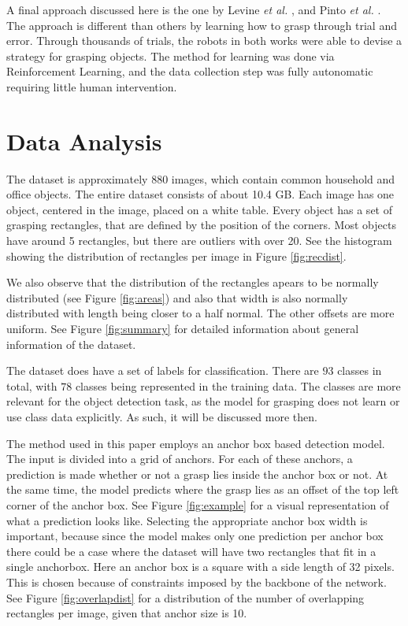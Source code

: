 \documentclass{article}
\begin{document}
A final approach discussed here is the one by Levine \textit{et al.} \cite{levine2018},
and Pinto \textit{et al.} \cite{pinto2016}. The approach is different than others by
learning how to grasp through trial and error. Through thousands of trials, the
robots in both works were able to devise a strategy for grasping objects. The method
for learning was done via Reinforcement Learning, and the data collection step was
fully autonomatic requiring little human intervention.

\newpage
\section{Data Analysis}
The dataset is approximately 880 images, which contain common
household and office objects. The entire dataset consists of about 10.4 GB.
Each image has one object, centered in the image, placed on a white table.
Every object has a set of grasping rectangles, that are defined by the position
of the corners. Most objects have around 5 rectangles, but there are outliers
with over 20. See the histogram showing the distribution of rectangles per image
in Figure \ref{fig:recdist}.

We also observe that the distribution of
the rectangles apears to be normally distributed (see Figure \ref{fig:areas})
and also that width is also normally distributed with length being closer
to a half normal. The other offsets are more uniform.
See Figure \ref{fig:summary} for detailed information about general
information of the dataset.

The dataset does have a set of labels for classification.
There are $93$ classes in total, with $78$ classes being represented in the
training data.
The classes are more relevant for the object detection task, as the model for
grasping does not learn or use class data explicitly. As such, it will be discussed
more then.

The method used in this paper employs an anchor box
based detection model. The input is divided into a grid of anchors. For each of
these anchors, a prediction is made whether or not a grasp lies inside the
anchor box or not. At the same time, the model predicts where the grasp lies
as an offset of the top left corner of the anchor box. See Figure \ref{fig:example}
for a visual representation of what a prediction looks like.
Selecting the appropriate anchor box width is important, because
since the model makes only one prediction per anchor box there could
be a case where the dataset will have two rectangles that fit in a single
anchorbox.
Here an anchor box is a square with a side length of 32 pixels. This
is chosen because of constraints imposed by the backbone of the network.
See Figure \ref{fig:overlapdist} for a distribution of the number
of overlapping rectangles per image, given that anchor size is 10.
\end{document}
